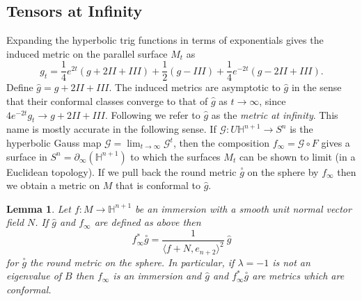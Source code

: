 \documentclass{amsart}
\newcommand{\two}{I\!\!I}
\newcommand{\three}{I\!\!I\!\!I}
\newtheorem{lem}[thm]{Lemma}
\renewcommand{\H}{\mathbb{H}}
\begin{document}
\subsection{Tensors at Infinity}

Expanding the hyperbolic trig functions in terms of exponentials gives the induced metric on the parallel surface $M_t$ as 
\[
g_t = \frac{1}{4}e^{2t}(g + 2\two + \three) + \frac{1}{2}(g - \three) + \frac{1}{4}e^{-2t}(g - 2\two + \three).
\]
Define $\hat{g} = g + 2\two + \three$.
The induced metrics are asymptotic to $\hat{g}$ in the sense that their conformal classes converge to that of $\hat{g}$ as $t \to \infty$, since $4e^{-2t}g_t \to g + 2\two + \three$.
Following \cite{Krasnov-Schlenker2008} we refer to $\hat{g}$ as the \emph{metric at infinity}.
This name is mostly accurate in the following sense. 
If $\mathcal{G}: U\H^{n+1} \to S^n$ is the hyperbolic Gauss map $\mathcal{G} = \lim_{t \to \infty} \mathcal{G}^t$, then the composition $f_\infty = \mathcal{G} \circ F$ gives a
surface in $S^n = \partial_\infty(\H^{n+1})$ to which the surfaces $M_t$ can be shown to limit (in a Euclidean topology). 
If we pull back the round metric $\overset{\circ}{g}$ on the sphere by $f_\infty$ then we obtain a metric on $M$ that is conformal to $\hat{g}$. 

\begin{lem}
\label{HypGaussMap}
Let $f: M \to \H^{n+1}$ be an immersion with a smooth unit normal vector field $N$. If $\hat{g}$ and $f_\infty$ are defined as above then 
\[
f^*_\infty \overset{\circ}{g} = \frac{1}{\langle f + N, e_{n+2}\rangle^2} \ \hat{g}
\]
for $\overset{\circ}{g}$ the round metric on the sphere.
In particular, if $\lambda =-1$ is not an eigenvalue of $B$ then $f_\infty$ is an immersion and $\hat{g}$ and $f_\infty^*\overset{\circ}{g}$ are metrics which are conformal.
\end{lem}
\end{document}
